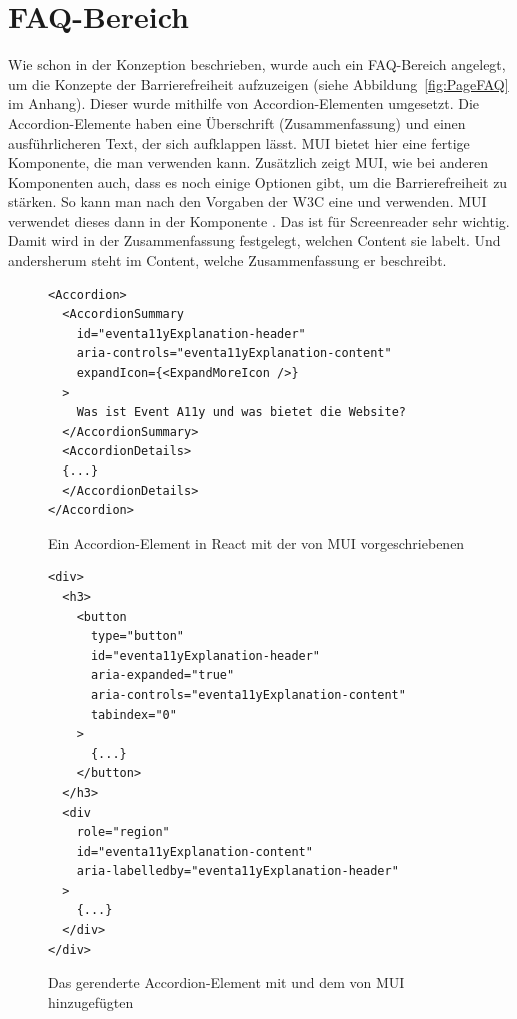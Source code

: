 \section{FAQ-Bereich}
Wie schon in der Konzeption beschrieben, wurde auch ein FAQ-Bereich angelegt, um die Konzepte der Barrierefreiheit aufzuzeigen (siehe Abbildung~\ref{fig:PageFAQ} im Anhang). Dieser wurde mithilfe von Accordion-Elementen umgesetzt. Die Accordion-Elemente haben eine Überschrift (Zusammenfassung) und einen ausführlicheren Text, der sich aufklappen lässt. MUI bietet hier eine fertige Komponente, die man verwenden kann. Zusätzlich zeigt MUI, wie bei anderen Komponenten auch, dass es noch einige Optionen gibt, um die Barrierefreiheit zu stärken. So kann man nach den Vorgaben der W3C \parencite[vgl.][]{w3c_accordion-pattern_nodate} eine  und  verwenden. MUI verwendet dieses dann in der Komponente \parencite[vgl.][]{mui_accordion_nodate}. Das ist für Screenreader sehr wichtig. Damit wird in der Zusammenfassung festgelegt, welchen Content sie labelt. Und andersherum steht im Content, welche Zusammenfassung er beschreibt.

\begin{figure}[H]
\begin{verbatim}
<Accordion>
  <AccordionSummary
    id="eventa11yExplanation-header"
    aria-controls="eventa11yExplanation-content"
    expandIcon={<ExpandMoreIcon />}
  >
    Was ist Event A11y und was bietet die Website?
  </AccordionSummary>
  <AccordionDetails>
  {...}
  </AccordionDetails>
</Accordion>
\end{verbatim}
\caption{Ein Accordion-Element in React mit der von MUI vorgeschriebenen }
\end{figure}

\begin{figure}[H]
\begin{verbatim}
<div>
  <h3>
    <button
      type="button"
      id="eventa11yExplanation-header"
      aria-expanded="true"
      aria-controls="eventa11yExplanation-content"
      tabindex="0"
    >
      {...}
    </button>
  </h3>
  <div
    role="region"
    id="eventa11yExplanation-content"
    aria-labelledby="eventa11yExplanation-header"
  >
    {...}
  </div>
</div>
\end{verbatim}
\caption{Das gerenderte Accordion-Element mit  und dem von MUI hinzugefügten }
\end{figure}

